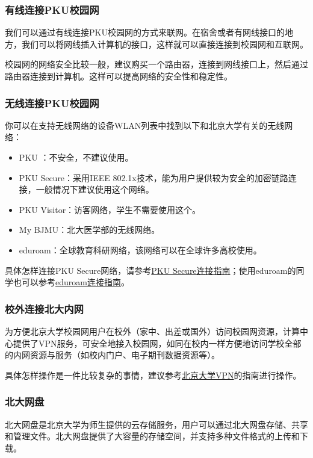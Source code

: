 \subsubsection{有线连接PKU校园网}

我们可以通过有线连接PKU校园网的方式来联网。在宿舍或者有网线接口的地方，我们可以将网线插入计算机的接口，这样就可以直接连接到校园网和互联网。

校园网的网络安全比较一般，建议购买一个路由器，连接到网线接口上，然后通过路由器连接到计算机。这样可以提高网络的安全性和稳定性。

\subsubsection{无线连接PKU校园网}

你可以在支持无线网络的设备WLAN列表中找到以下和北京大学有关的无线网络：
\begin{itemize}
  \item PKU ：不安全，不建议使用。
  \item PKU Secure：采用IEEE 802.1x技术，能为用户提供较为安全的加密链路连接，一般情况下建议使用这个网络。
  \item PKU Visitor：访客网络，学生不需要使用这个。
  \item My BJMU：北大医学部的无线网络。
  \item eduroam：全球教育科研网络，该网络可以在全球许多高校使用。
\end{itemize}
具体怎样连接PKU Secure网络，请参考\href{https://its.pku.edu.cn/setting_6.jsp}{PKU Secure连接指南}；使用eduroam的同学也可以参考\href{https://its.pku.edu.cn/service_1_eduroam.jsp}{eduroam连接指南}。

\subsubsection{校外连接北大内网}

为方便北京大学校园网用户在校外（家中、出差或国外）访问校园网资源，计算中心提供了VPN服务，可安全地接入校园网，如同在校内一样方便地访问学校全部的内网资源与服务（如校内门户、电子期刊数据资源等）。

具体怎样操作是一件比较复杂的事情，建议参考\href{https://its.pku.edu.cn/service_1_vpn.jsp}{北京大学VPN}的指南进行操作。

\subsubsection{北大网盘}

北大网盘是北京大学为师生提供的云存储服务，用户可以通过北大网盘存储、共享和管理文件。北大网盘提供了大容量的存储空间，并支持多种文件格式的上传和下载。


